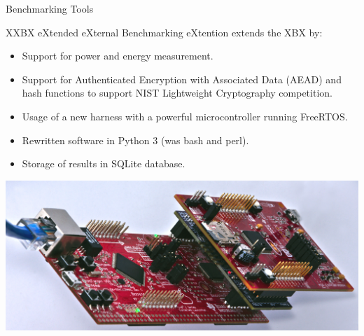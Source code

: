 \documentclass[xcolor=pdftex,dvipsnames,table,final]{beamer}
\begin{document}
\begin{frame}[fragile]{}
\begin{columns}[t, totalwidth=\textwidth]
\begin{column}{.31\linewidth}
\begin{block}{Benchmarking Tools}
      \end{block}
%        
      \begin{block}{XXBX}
        {e\color{red}X}tended e{\color{red}X}ternal {\color{red}B}enchmarking 
        e{\color{red}X}tention extends the XBX by:%
        \begin{itemize}
          \item Support for power and energy measurement.
          \item Support for Authenticated Encryption with Associated Data (AEAD) and hash functions
                to support NIST Lightweight Cryptography competition.
          \item Usage of a new harness with a powerful microcontroller running FreeRTOS.
          \item Rewritten software in Python 3 (was bash and perl).
          \item Storage of results in SQLite database.
        \end{itemize}
        \begin{center}
          \includegraphics[scale=1.5]{../figures/xxbx-tilted}

\end{center}
\end{block}
\end{column}
\end{columns}
\end{frame}
\end{document}
